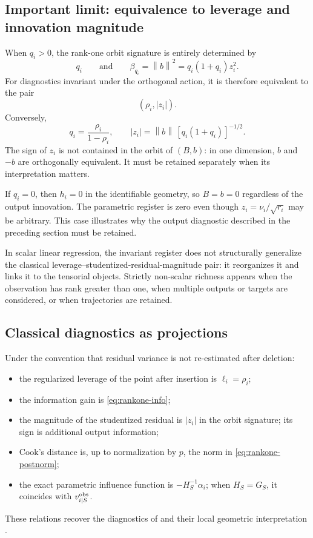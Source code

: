 \documentclass[10pt,a4paper]{article}
\newcommand{\norm}[1]{\left\lVert #1\right\rVert}
\begin{document}
\subsection{Important limit: equivalence to leverage and innovation magnitude}
When $q_i>0$, the rank-one orbit signature is entirely determined by
\begin{equation}
q_i
\qquad\text{and}\qquad
\beta_{q_i}=\norm{b}^2=q_i(1+q_i)z_i^2.
\end{equation}
For diagnostics invariant under the orthogonal action, it is therefore equivalent to the pair
\begin{equation}
\boxed{(\rho_i,|z_i|).}
\label{eq:rankone-complete-pair}
\end{equation}
Conversely,
\[
q_i=\frac{\rho_i}{1-\rho_i},
\qquad
|z_i|=\norm{b}\,[q_i(1+q_i)]^{-1/2}.
\]
The sign of $z_i$ is not contained in the orbit of $(B,b)$: in one dimension, $b$ and $-b$ are orthogonally equivalent. It must be retained separately when its interpretation matters.

If $q_i=0$, then $h_i=0$ in the identifiable geometry, so $B=b=0$ regardless of the output innovation. The parametric register is zero even though $z_i=\nu_i/\sqrt{r_i}$ may be arbitrary. This case illustrates why the output diagnostic described in the preceding section must be retained.

\begin{ochrebox}
In scalar linear regression, the invariant register does not structurally generalize the classical leverage--studentized-residual-magnitude pair: it reorganizes it and links it to the tensorial objects. Strictly non-scalar richness appears when the observation has rank greater than one, when multiple outputs or targets are considered, or when trajectories are retained.
\end{ochrebox}

\subsection{Classical diagnostics as projections}
Under the convention that residual variance is not re-estimated after deletion:
\begin{itemize}
  \item the regularized leverage of the point after insertion is $\ell_i=\rho_i$;
  \item the information gain is \eqref{eq:rankone-info};
  \item the magnitude of the studentized residual is $|z_i|$ in the orbit signature; its sign is additional output information;
  \item Cook's distance is, up to normalization by $p$, the norm in \eqref{eq:rankone-postnorm};
  \item the exact parametric influence function is $-H_S^{-1}\alpha_i$; when $H_S=G_S$, it coincides with $v_{i\mid S}^{\rm obs}$.
\end{itemize}
These relations recover the diagnostics of \citet{cook1977,hampel1974} and their local geometric interpretation \citep{cook1986,stlaurent1993}.
\end{document}

